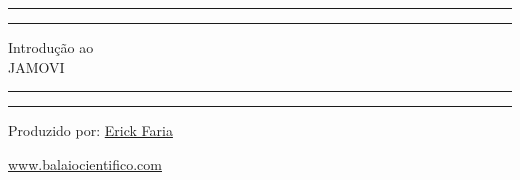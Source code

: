 \begin{titlepage}
	\centering %
	\scshape %
	\vspace*{1.5\baselineskip} %

	\rule{13cm}{1.6pt}\vspace*{-\baselineskip}\vspace*{2pt} %
	\rule{13cm}{0.4pt} %
	
		\vspace{0.75\baselineskip} %
	{	\Huge Introdução ao\\ 
			\vspace{4mm}
		JAMOVI \\	}
		\vspace{0.75\baselineskip} %
	\rule{13cm}{0.4pt}\vspace*{-\baselineskip}\vspace{3.2pt} %
	\rule{13cm}{1.6pt} %
	
		\vspace{1.75\baselineskip} %
	{\large Produzido por: \href{https://www.balaiocientifico.com/author/erickfaria/}{Erick Faria} \\
		\vspace*{1.2\baselineskip}}
	\vfill
	
\url{www.balaiocientifico.com}\\
\vspace{0.5cm}
\ccby
\end{titlepage}